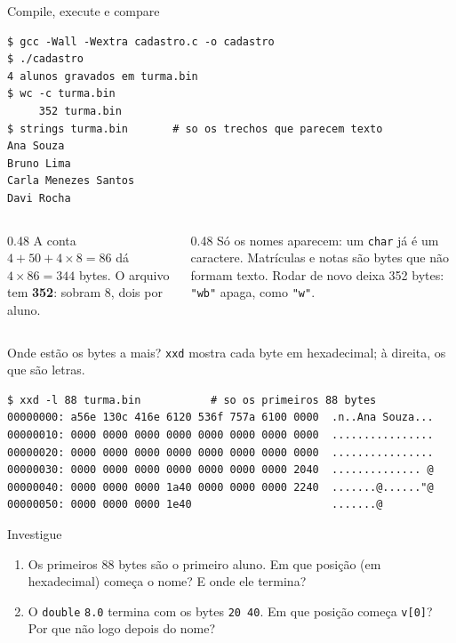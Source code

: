 \documentclass[aspectratio=169]{beamer}
\begin{document}
\begin{frame}[fragile]{Compile, execute e compare}
\begin{lstlisting}[style=shellStyle]
$ gcc -Wall -Wextra cadastro.c -o cadastro
$ ./cadastro
4 alunos gravados em turma.bin
$ wc -c turma.bin
     352 turma.bin
$ strings turma.bin       # so os trechos que parecem texto
Ana Souza
Bruno Lima
Carla Menezes Santos
Davi Rocha
\end{lstlisting}
  \begin{columns}[T]
    \begin{column}{0.48\textwidth}
      \small A conta $4 + 50 + 4 \times 8 = 86$ dá $4 \times 86 = 344$
      bytes. O arquivo tem \textbf{352}: sobram 8, dois por aluno.
    \end{column}
    \begin{column}{0.48\textwidth}
      \small Só os nomes aparecem: um \texttt{char} já é um caractere.
      Matrículas e notas são bytes que não formam texto. Rodar de novo deixa 352 bytes:
      \texttt{"wb"} apaga, como \texttt{"w"}.
    \end{column}
  \end{columns}
\end{frame}

\begin{frame}[fragile]{Onde estão os bytes a mais?}
  \vspace{-0.4em}
  \texttt{xxd} mostra cada byte em hexadecimal; à direita, os que são letras.
\begin{lstlisting}[style=shellStyle, language={}]
$ xxd -l 88 turma.bin           # so os primeiros 88 bytes
00000000: a56e 130c 416e 6120 536f 757a 6100 0000  .n..Ana Souza...
00000010: 0000 0000 0000 0000 0000 0000 0000 0000  ................
00000020: 0000 0000 0000 0000 0000 0000 0000 0000  ................
00000030: 0000 0000 0000 0000 0000 0000 0000 2040  .............. @
00000040: 0000 0000 0000 1a40 0000 0000 0000 2240  .......@......"@
00000050: 0000 0000 0000 1e40                      .......@
\end{lstlisting}
  \begin{block}{Investigue}
    \small
    \begin{enumerate}
      \item Os primeiros 88 bytes são o primeiro aluno. Em que posição (em
        hexadecimal) começa o nome? E onde ele termina?
      \item O \texttt{double} \texttt{8.0} termina com os bytes
        \texttt{20 40}. Em que posição começa \texttt{v[0]}? Por que não
        logo depois do nome?
    \end{enumerate}
  \end{block}
\end{frame}
\end{document}
